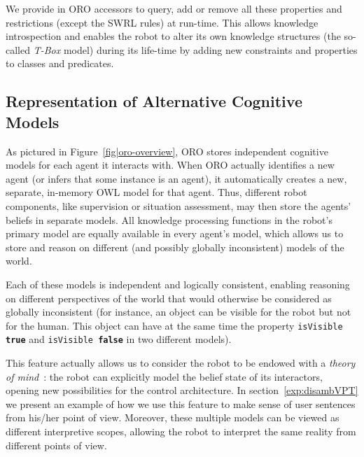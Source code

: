 \documentclass{svmult}
\newcommand{\concept}[1]{{\footnotesize \texttt{#1}}}
\begin{document}
We provide in ORO accessors to query, add or remove all these properties and
restrictions (except the SWRL rules) at run-time. This allows
knowledge introspection and enables the robot to alter its own knowledge
structures (the so-called \emph{T-Box} model) during its life-time by adding
new constraints and properties to classes and predicates.

\subsection{Representation of Alternative Cognitive Models}
\label{alterite}

As pictured in Figure~\ref{fig|oro-overview}, ORO stores independent cognitive
models for each agent it interacts with. When ORO actually identifies a new
agent (or infers that some instance is an agent), it automatically creates a
new, separate, in-memory OWL model for that agent. Thus, different robot
components, like supervision or situation assessment, may then store the
agents' beliefs in separate models. All knowledge processing functions in the
robot's primary model are equally available in every agent's model, which
allows us to store and reason on different (and possibly globally inconsistent)
models of the world.

Each of these models is independent and logically consistent,
enabling reasoning on different perspectives of the world that would otherwise
be considered as globally inconsistent (for instance, an object can be visible for the
robot but not for the human. This object can have at the same time the property
\concept{isVisible \textbf{true}} and \concept{isVisible \textbf{false}} in
two different models). 

This feature actually allows us to consider the robot to be endowed with a
\emph{theory of mind}~\cite{Scassellati2002}: the robot can explicitly model
the belief state of its interactors, opening new possibilities for the control
architecture. In section~\ref{exp:disambVPT} we present an example of how we use this feature to
make sense of user sentences from his/her point of view. Moreover,
these multiple models can be viewed as different interpretive scopes,
allowing the robot to interpret the same reality from different points of view.
\end{document}
